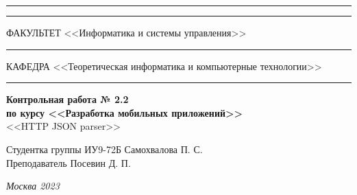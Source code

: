 \documentclass[a4paper, 14pt]{extarticle}
\begin{document}
\begin{titlepage}
\vspace{-25pt}
\hspace{-35pt}\rule{\textwidth}{2.3pt}

\vspace*{-20.3pt}
\hspace{-35pt}\rule{\textwidth}{0.4pt}

\vspace{1.5ex}
\hspace{-35pt} \noindent \small ФАКУЛЬТЕТ\hspace{80pt} <<Информатика и системы управления>>

\vspace*{-16pt}
\hspace{47pt}\rule{0.83\textwidth}{0.4pt}

\vspace{0.5ex}
\hspace{-35pt} \noindent \small КАФЕДРА\hspace{50pt} <<Теоретическая информатика и компьютерные технологии>>

\vspace*{-16pt}
\hspace{30pt}\rule{0.866\textwidth}{0.4pt}

\vspace{11em}

\begin{center}
\Large {\bf Контрольная работа № 2.2} \\
\large {\bf по курсу <<Разработка мобильных приложений>>} \\
\large <<HTTP JSON parser>>
\end{center}\normalsize

\vspace{8em}


\begin{flushright}
  {Студентка группы ИУ9-72Б Самохвалова П. С. \hspace*{15pt}\\
  \vspace{2ex}
  Преподаватель Посевин Д. П.\hspace*{15pt}}
\end{flushright}

\bigskip

\vfill


\begin{center}
\textsl{Москва 2023}
\end{center}
\end{titlepage}
\end{document}
